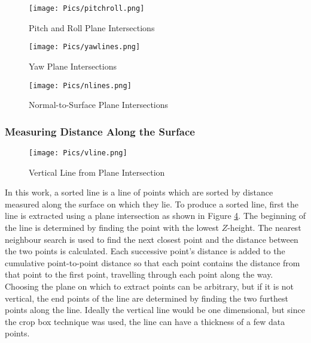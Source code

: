 \begin{figure}[H]
    \centering
    \texttt{[image: Pics/pitchroll.png]}
    \caption{Pitch and Roll Plane Intersections}
    \label{fig:pitchroll}
\end{figure}
\begin{figure}[H]
    \centering
    \texttt{[image: Pics/yawlines.png]}
    \caption{Yaw Plane Intersections}
    \label{fig:yawplane}
\end{figure}

\begin{figure}[H]
    \centering
    \texttt{[image: Pics/nlines.png]}
    \caption{Normal-to-Surface Plane Intersections}
    \label{fig:nplanes}
\end{figure}

\subsubsection{Measuring Distance Along the Surface}

\begin{figure}[H]
    \centering
    \texttt{[image: Pics/vline.png]}
    \caption{Vertical Line from Plane Intersection}
    \label{fig:vline}
\end{figure}

In this work, a sorted line is a line of points which are sorted by distance measured along the surface on which they lie. To produce a sorted line, first the line is extracted using a plane intersection as shown in Figure \ref{fig:vline}. The beginning of the line is determined by finding the point with the lowest $Z$-height. The nearest neighbour search is used to find the next closest point and the distance between the two points is calculated. Each successive point's distance is added to the cumulative point-to-point distance so that each point contains the distance from that point to the first point, travelling through each point along the way. Choosing the plane on which to extract points can be arbitrary, but if it is not vertical, the end points of the line are determined by finding the two furthest points along the line. Ideally the vertical line would be one dimensional, but since the crop box technique was used, the line can have a thickness of a few data points. \\

